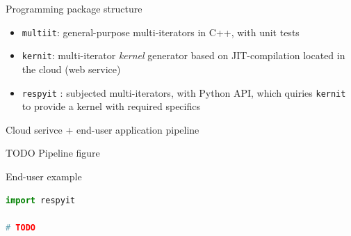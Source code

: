 \documentclass[aspectratio=169,twoside]{beamer}
\begin{document}
\begin{frame}[fragile]{Programming package structure}

\begin{itemize}
\item \texttt{multiit}: general-purpose multi-iterators in C++, with unit tests
\item \texttt{kernit}: multi-iterator \emph{kernel} generator based on JIT-compilation located in the cloud (web service)
\item \texttt{respyit} : subjected multi-iterators, with Python API, which quiries \texttt{kernit} to provide a kernel with required specifics
\end{itemize}

\end{frame}



\begin{frame}[fragile]{Cloud serivce + end-user application pipeline}

TODO Pipeline figure

\end{frame}



\begin{frame}[fragile]{End-user example}

\begin{lstlisting}[basicstyle=\tiny\ttfamily, language=python]
import respyit

# TODO
\end{lstlisting}

\end{frame}
\end{document}
